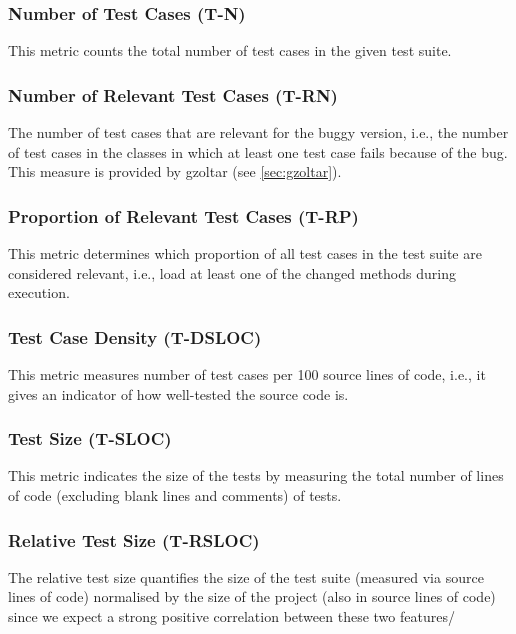 \subsubsection{Number of Test Cases (T-N)}

This metric counts the total number of test cases in the given test suite. 

\subsubsection{Number of Relevant Test Cases (T-RN)}

The number of test cases that are relevant for the buggy version, i.e., the
number of test cases in the classes in which at least one test case fails
because of the bug. This measure is provided by gzoltar (see \ref{sec:gzoltar}).

\subsubsection{Proportion of Relevant Test Cases (T-RP)}

This metric determines which proportion of all test cases in the test suite are
considered relevant, i.e., load at least one of the changed methods during
execution.

\subsubsection{Test Case Density (T-DSLOC)}

This metric measures number of test cases per 100 source lines of code, i.e., it gives an indicator of how well-tested the source code is.

\subsubsection{Test Size (T-SLOC)}

This metric indicates the size of the tests by measuring the total number of lines of code (excluding blank lines and comments) of tests.

\subsubsection{Relative Test Size (T-RSLOC)}

The relative test size quantifies the size of the test suite (measured via source lines of code) normalised by the size of the project (also in source lines of code) since we expect a strong positive correlation between these two features/

